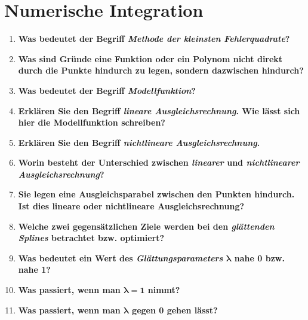 \section{Numerische Integration}
	\begin{enumerate}
		\item \textbf{Was bedeutet der Begriff \textit{Methode der kleinsten Fehlerquadrate}?} \\
		
		\item \textbf{Was sind Gründe eine Funktion oder ein Polynom nicht direkt durch die Punkte hindurch zu legen, sondern dazwischen hindurch?} \\
		
		\item \textbf{Was bedeutet der Begriff \textit{Modellfunktion}?} \\
		
		\item \textbf{Erklären Sie den Begriff \textit{lineare Ausgleichsrechnung}. Wie lässt sich hier die Modellfunktion schreiben?} \\
		
		\item \textbf{Erklären Sie den Begriff \textit{nichtlineare Ausgleichsrechnung}.} \\
		
		\item \textbf{Worin besteht der Unterschied zwischen \textit{linearer} und \textit{nichtlinearer Ausgleichsrechnung}?} \\
		
		\item \textbf{Sie legen eine Ausgleichsparabel zwischen den Punkten hindurch. Ist dies lineare oder	nichtlineare Ausgleichsrechnung?} \\
		
		\item \textbf{Welche zwei gegensätzlichen Ziele werden bei den \textit{glättenden Splines} betrachtet bzw. optimiert?} \\
		
		\item \textbf{Was bedeutet ein Wert des \textit{Glättungsparameters} \(\mathbf{\lambda}\) nahe 0 bzw. nahe 1?} \\
		
		\item \textbf{Was passiert, wenn man \(\mathbf{\lambda=1}\) nimmt?} \\
		
		\item \textbf{Was passiert, wenn man \(\mathbf{\lambda}\) gegen 0 gehen lässt?} \\

	\end{enumerate}